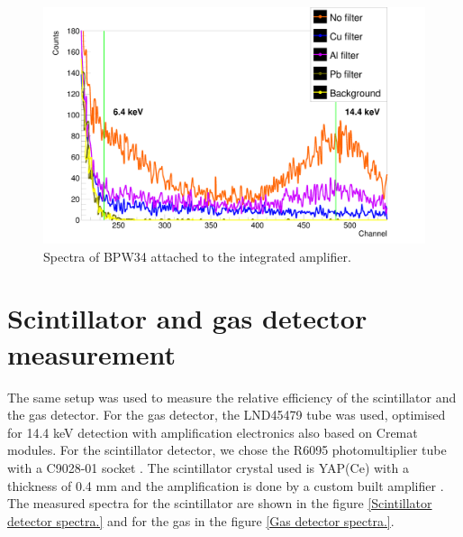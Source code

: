 \begin{figure}[H]
\centering
\includegraphics[scale=0.125, angle = 0]{./pictures/BPW34Spectre.png}
\caption{Spectra of BPW34 attached to the integrated amplifier.}
\label{BPW34 integrated amplifier spectra.}

\end{figure}


\section{Scintillator and gas detector measurement}
The same setup was used to measure the relative efficiency of the scintillator and the gas detector. For the gas detector, the LND45479 tube was used, optimised for 14.4 keV detection with amplification electronics also based on Cremat modules. For the scintillator detector, we chose the R6095 photomultiplier tube \cite{R6095} with a C9028-01 socket \cite{C9028}. The scintillator crystal used is YAP(Ce) with a thickness of 0.4 mm and the amplification is done by a custom built amplifier \cite{STEJSKAL2019thesis}. The measured spectra for the scintillator are shown in the figure \ref{Scintillator detector spectra.} and for the gas in the figure \ref{Gas detector spectra.}.

